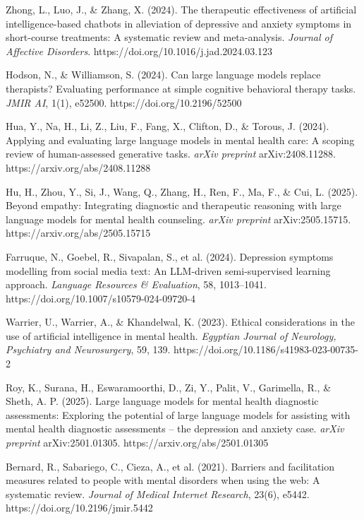 \documentclass[sn-basic,authoryear]{sn-jnl}
\begin{document}
\begin{thebibliography}{99}
Zhong, L., Luo, J., \& Zhang, X. (2024). The therapeutic effectiveness of artificial intelligence-based chatbots in alleviation of depressive and anxiety symptoms in short-course treatments: A systematic review and meta-analysis. \textit{Journal of Affective Disorders}. https://doi.org/10.1016/j.jad.2024.03.123

Hodson, N., \& Williamson, S. (2024). Can large language models replace therapists? Evaluating performance at simple cognitive behavioral therapy tasks. \textit{JMIR AI}, 1(1), e52500. https://doi.org/10.2196/52500

Hua, Y., Na, H., Li, Z., Liu, F., Fang, X., Clifton, D., \& Torous, J. (2024). Applying and evaluating large language models in mental health care: A scoping review of human-assessed generative tasks. \textit{arXiv preprint} arXiv:2408.11288. https://arxiv.org/abs/2408.11288

Hu, H., Zhou, Y., Si, J., Wang, Q., Zhang, H., Ren, F., Ma, F., \& Cui, L. (2025). Beyond empathy: Integrating diagnostic and therapeutic reasoning with large language models for mental health counseling. \textit{arXiv preprint} arXiv:2505.15715. https://arxiv.org/abs/2505.15715

Farruque, N., Goebel, R., Sivapalan, S., et al. (2024). Depression symptoms modelling from social media text: An LLM-driven semi-supervised learning approach. \textit{Language Resources \& Evaluation}, 58, 1013–1041. https://doi.org/10.1007/s10579-024-09720-4

Warrier, U., Warrier, A., \& Khandelwal, K. (2023). Ethical considerations in the use of artificial intelligence in mental health. \textit{Egyptian Journal of Neurology, Psychiatry and Neurosurgery}, 59, 139. https://doi.org/10.1186/s41983-023-00735-2

Roy, K., Surana, H., Eswaramoorthi, D., Zi, Y., Palit, V., Garimella, R., \& Sheth, A. P. (2025). Large language models for mental health diagnostic assessments: Exploring the potential of large language models for assisting with mental health diagnostic assessments – the depression and anxiety case. \textit{arXiv preprint} arXiv:2501.01305. https://arxiv.org/abs/2501.01305

Bernard, R., Sabariego, C., Cieza, A., et al. (2021). Barriers and facilitation measures related to people with mental disorders when using the web: A systematic review. \textit{Journal of Medical Internet Research}, 23(6), e5442. https://doi.org/10.2196/jmir.5442


\end{thebibliography}
\end{document}
